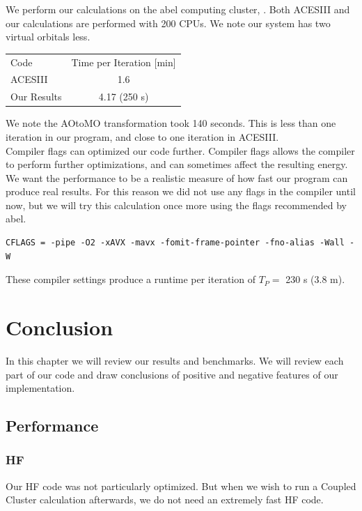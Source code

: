 \documentclass[a4paper,norsk,11pt,twoside]{report}
\begin{document}
We perform our calculations on the abel computing cluster, \cite{abel_po_g_citation1234567}. Both ACESIII and our calculations are performed with 200 CPUs. We note our system has two virtual orbitals less. \\

\begin{center}
\begin{tabular}{ l c}
	\hline
  	Code & Time per Iteration [min] \\
  	ACESIII & 1.6 \\
  	Our Results & 4.17 (250 s) \\ \hline
	\end{tabular}
\end{center}

We note the AOtoMO transformation took 140 seconds. This is less than one iteration in our program, and close to one iteration in ACESIII. \\

Compiler flags can optimized our code further. Compiler flags allows the compiler to perform further optimizations, and can sometimes affect the resulting energy. We want the performance to be a realistic measure of how fast our program can produce real results. For this reason we did not use any flags in the compiler until now, but we will try this calculation once more using the flags recommended by abel. 

\begin{lstlisting}
CFLAGS = -pipe -O2 -xAVX -mavx -fomit-frame-pointer -fno-alias -Wall -W
\end{lstlisting}
These compiler settings produce a runtime per iteration of $T_P = $ 230 s (3.8 m).


\chapter{Conclusion}
In this chapter we will review our results and benchmarks. We will review each part of our code and draw conclusions of positive and negative features of our implementation. 

\section{Performance}

\subsection{HF}
Our HF code was not particularly optimized. But when we wish to run a Coupled Cluster calculation afterwards, we do not need an extremely fast HF code. \\
\end{document}
